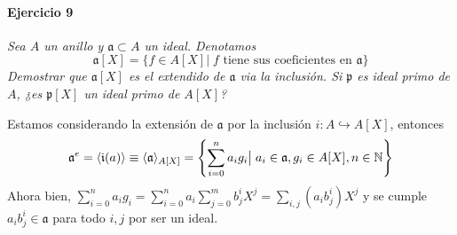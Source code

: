 \documentclass[../main.tex]{subfiles}
\begin{document}
\paragraph{Ejercicio 9} \textit{Sea $A$ un anillo y $\mathfrak a \subset A$ un ideal. Denotamos
\[\mathfrak a [X] = \{ f \in A[X] \vert \; f \text{ tiene sus coeficientes en } \mathfrak a\}\]
Demostrar que $\mathfrak a[X]$ es el extendido de $\mathfrak a$ via la inclusión. Si $\mathfrak p$ es ideal primo de $A$, ¿es $\mathfrak p[X]$ un ideal primo de $A[X]$?}

Estamos considerando la extensión de $\mathfrak a$ por la inclusión $i:A\hookrightarrow A[X]$, entonces
$$
\mathfrak a^e = \langle \mathfrak i(a) \rangle \equiv \langle \mathfrak a\rangle_{A[X]} = \left\{\sum_{i=0}^n a_i g_i\big \vert\; a_i \in \mathfrak a, g_i \in A[X],n\in \mathbb{N}   \right\}
$$
Ahora bien, $\sum_{i=0}^n a_i g_i = \sum_{i=0}^n a_i \sum_{j=0}^m b^i_j X^j = \sum_{i,j}(a_ib^i_j) X^j$ y se cumple  $a_ib^i_j \in  \mathfrak a$ para todo $i,j$ por ser un ideal.

%
%
%
%
%
%
%
\end{document}
